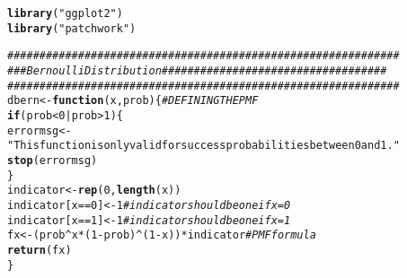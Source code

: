 \documentclass{article}\usepackage[]{graphicx}\usepackage[]{color}
\makeatletter
\newcommand{\hlnum}[1]{\textcolor[rgb]{0.686,0.059,0.569}{#1}}%
\newcommand{\hlstr}[1]{\textcolor[rgb]{0.192,0.494,0.8}{#1}}%
\newcommand{\hlcom}[1]{\textcolor[rgb]{0.678,0.584,0.686}{\textit{#1}}}%
\newcommand{\hlopt}[1]{\textcolor[rgb]{0,0,0}{#1}}%
\newcommand{\hlstd}[1]{\textcolor[rgb]{0.345,0.345,0.345}{#1}}%
\newcommand{\hlkwa}[1]{\textcolor[rgb]{0.161,0.373,0.58}{\textbf{#1}}}%
\newcommand{\hlkwb}[1]{\textcolor[rgb]{0.69,0.353,0.396}{#1}}%
\newcommand{\hlkwc}[1]{\textcolor[rgb]{0.333,0.667,0.333}{#1}}%
\newcommand{\hlkwd}[1]{\textcolor[rgb]{0.737,0.353,0.396}{\textbf{#1}}}%
\newenvironment{kframe}{%
 \def\at@end@of@kframe{}%
 \ifinner\ifhmode%
  \def\at@end@of@kframe{\end{minipage}}%
  \begin{minipage}{\columnwidth}%
 \fi\fi%
 \def\FrameCommand##1{\hskip\@totalleftmargin \hskip-\fboxsep
 \colorbox{shadecolor}{##1}\hskip-\fboxsep
     \hskip-\linewidth \hskip-\@totalleftmargin \hskip\columnwidth}%
 \MakeFramed {\advance\hsize-\width
   \@totalleftmargin\z@ \linewidth\hsize
   \@setminipage}}%
 {\par\unskip\endMakeFramed%
 \at@end@of@kframe}
\newenvironment{knitrout}{}{} %
\makeatother
\begin{document}
\begin{enumerate}
\begin{knitrout}
\begin{kframe}
{\ttfamily\noindent\itshape\color{messagecolor}{\#\# -- Conflicts ------------------------------------------ tidyverse\_conflicts() --\\\#\# x dplyr::filter() masks stats::filter()\\\#\# x dplyr::lag() \ \ \ masks stats::lag()}}\begin{alltt}
\hlkwd{library}\hlstd{(}\hlstr{"ggplot2"}\hlstd{)}
\hlkwd{library}\hlstd{(}\hlstr{"patchwork"}\hlstd{)}

\hlcom{#############################################################}
\hlcom{###Bernoulli Distribution ###################################}
\hlcom{#############################################################}
\hlstd{dbern}\hlkwb{<-}\hlkwa{function}\hlstd{(}\hlkwc{x}\hlstd{,}\hlkwc{prob}\hlstd{)\{}                \hlcom{#DEFINING THE PMF}
  \hlkwa{if}\hlstd{(prob}\hlopt{<}\hlnum{0} \hlopt{|} \hlstd{prob}\hlopt{>}\hlnum{1}\hlstd{)\{}
    \hlstd{errormsg} \hlkwb{<-} \hlstr{"This function is only valid for success probabilities between 0 and 1."}
    \hlkwd{stop}\hlstd{(errormsg)}
  \hlstd{\}}
  \hlstd{indicator} \hlkwb{<-} \hlkwd{rep}\hlstd{(}\hlnum{0}\hlstd{,} \hlkwd{length}\hlstd{(x))}
  \hlstd{indicator[x}\hlopt{==}\hlnum{0}\hlstd{]} \hlkwb{<-} \hlnum{1} \hlcom{# indicator should be one if x=0}
  \hlstd{indicator[x}\hlopt{==}\hlnum{1}\hlstd{]} \hlkwb{<-} \hlnum{1} \hlcom{# indicator should be one if x=1}
  \hlstd{fx} \hlkwb{<-} \hlstd{(prob}\hlopt{^}\hlstd{x} \hlopt{*} \hlstd{(}\hlnum{1}\hlopt{-}\hlstd{prob)}\hlopt{^}\hlstd{(}\hlnum{1}\hlopt{-}\hlstd{x))} \hlopt{*} \hlstd{indicator} \hlcom{# PMF formula}
  \hlkwd{return}\hlstd{(fx)}
\hlstd{\}}


\end{alltt}
\end{kframe}
\end{knitrout}
\end{enumerate}
\end{document}
